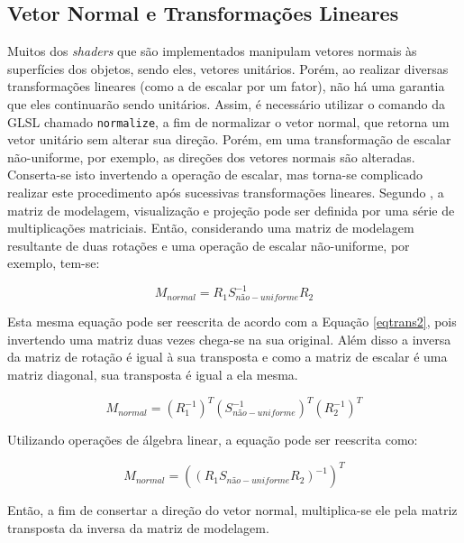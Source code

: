 	\subsection{Vetor Normal e Transformações Lineares}

	Muitos dos \textit{shaders} que são implementados manipulam vetores normais às superfícies dos objetos, sendo eles, vetores unitários. Porém, ao realizar diversas transformações lineares (como a de escalar por um fator), não há uma garantia que eles continuarão sendo unitários. Assim, é necessário utilizar o comando da GLSL chamado \texttt{normalize}, a fim de normalizar o vetor normal, que retorna um vetor unitário sem alterar sua direção. Porém, em uma transformação de escalar não-uniforme, por exemplo, as direções dos vetores normais são alteradas. Conserta-se isto invertendo a operação de escalar, mas torna-se complicado realizar este procedimento após sucessivas transformações lineares. Segundo  \cite{guha2011}, a matriz de modelagem, visualização e projeção pode ser definida por uma série de multiplicações matriciais. Então, considerando uma matriz de modelagem resultante de duas rotações e uma operação de escalar não-uniforme, por exemplo, tem-se:


	\begin{equation}
		M_ {normal} = R_ {1} S_ {não-uniforme}^{-1} R_ {2}
	\label{eqtrans1}
	\end{equation}

	Esta mesma equação pode ser reescrita de acordo com a Equação \ref{eqtrans2}, pois invertendo uma matriz duas vezes chega-se na sua original. Além disso a inversa da matriz de rotação é igual à sua transposta e como a matriz de escalar é uma matriz diagonal, sua transposta é igual a ela mesma.

	\begin{equation}
		M_ {normal} = (R_ {1}^{-1})^{T} (S_ {não-uniforme}^{-1})^{ T} (R_ {2}^{-1})^{T}
	\label{eqtrans2}
	\end{equation}

	Utilizando operações de álgebra linear, a equação pode ser reescrita como:

	\begin{equation}
		M_ {normal} = ((R_ {1} S_ {não-uniforme} R_ {2})^{-1})^{T}
	\label{eqtrans3}
	\end{equation}
	
	Então, a fim de consertar a direção do vetor normal, multiplica-se ele pela matriz transposta da inversa da matriz de modelagem.  

